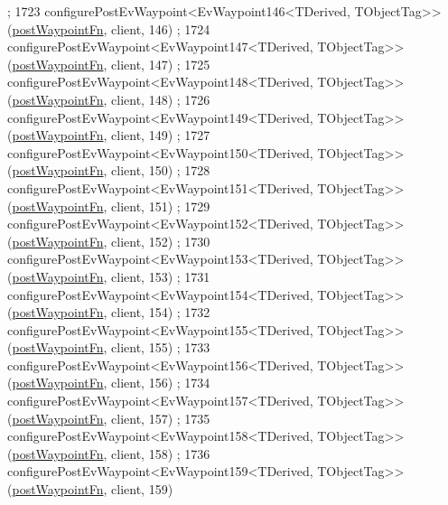 \begin{DoxyCode}
      ;
1723     configurePostEvWaypoint<EvWaypoint146<TDerived, TObjectTag>>(\hyperlink{classsmacc_1_1WaypointEventDispatcher_a6bccf6a93a827634b7b5e67ac0e4ec57}{postWaypointFn}, client, 146)
      ;
1724     configurePostEvWaypoint<EvWaypoint147<TDerived, TObjectTag>>(\hyperlink{classsmacc_1_1WaypointEventDispatcher_a6bccf6a93a827634b7b5e67ac0e4ec57}{postWaypointFn}, client, 147)
      ;
1725     configurePostEvWaypoint<EvWaypoint148<TDerived, TObjectTag>>(\hyperlink{classsmacc_1_1WaypointEventDispatcher_a6bccf6a93a827634b7b5e67ac0e4ec57}{postWaypointFn}, client, 148)
      ;
1726     configurePostEvWaypoint<EvWaypoint149<TDerived, TObjectTag>>(\hyperlink{classsmacc_1_1WaypointEventDispatcher_a6bccf6a93a827634b7b5e67ac0e4ec57}{postWaypointFn}, client, 149)
      ;
1727     configurePostEvWaypoint<EvWaypoint150<TDerived, TObjectTag>>(\hyperlink{classsmacc_1_1WaypointEventDispatcher_a6bccf6a93a827634b7b5e67ac0e4ec57}{postWaypointFn}, client, 150)
      ;
1728     configurePostEvWaypoint<EvWaypoint151<TDerived, TObjectTag>>(\hyperlink{classsmacc_1_1WaypointEventDispatcher_a6bccf6a93a827634b7b5e67ac0e4ec57}{postWaypointFn}, client, 151)
      ;
1729     configurePostEvWaypoint<EvWaypoint152<TDerived, TObjectTag>>(\hyperlink{classsmacc_1_1WaypointEventDispatcher_a6bccf6a93a827634b7b5e67ac0e4ec57}{postWaypointFn}, client, 152)
      ;
1730     configurePostEvWaypoint<EvWaypoint153<TDerived, TObjectTag>>(\hyperlink{classsmacc_1_1WaypointEventDispatcher_a6bccf6a93a827634b7b5e67ac0e4ec57}{postWaypointFn}, client, 153)
      ;
1731     configurePostEvWaypoint<EvWaypoint154<TDerived, TObjectTag>>(\hyperlink{classsmacc_1_1WaypointEventDispatcher_a6bccf6a93a827634b7b5e67ac0e4ec57}{postWaypointFn}, client, 154)
      ;
1732     configurePostEvWaypoint<EvWaypoint155<TDerived, TObjectTag>>(\hyperlink{classsmacc_1_1WaypointEventDispatcher_a6bccf6a93a827634b7b5e67ac0e4ec57}{postWaypointFn}, client, 155)
      ;
1733     configurePostEvWaypoint<EvWaypoint156<TDerived, TObjectTag>>(\hyperlink{classsmacc_1_1WaypointEventDispatcher_a6bccf6a93a827634b7b5e67ac0e4ec57}{postWaypointFn}, client, 156)
      ;
1734     configurePostEvWaypoint<EvWaypoint157<TDerived, TObjectTag>>(\hyperlink{classsmacc_1_1WaypointEventDispatcher_a6bccf6a93a827634b7b5e67ac0e4ec57}{postWaypointFn}, client, 157)
      ;
1735     configurePostEvWaypoint<EvWaypoint158<TDerived, TObjectTag>>(\hyperlink{classsmacc_1_1WaypointEventDispatcher_a6bccf6a93a827634b7b5e67ac0e4ec57}{postWaypointFn}, client, 158)
      ;
1736     configurePostEvWaypoint<EvWaypoint159<TDerived, TObjectTag>>(\hyperlink{classsmacc_1_1WaypointEventDispatcher_a6bccf6a93a827634b7b5e67ac0e4ec57}{postWaypointFn}, client, 159)

\end{DoxyCode}

